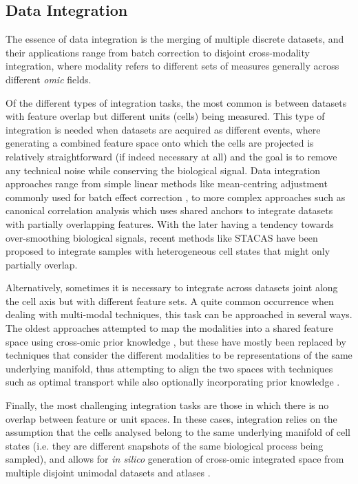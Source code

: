 \subsection{Data Integration}

The essence of data integration is the merging of multiple discrete datasets, and their applications range from batch correction to disjoint cross-modality integration, where modality refers to different sets of measures generally across different \emph{omic} fields.

Of the different types of integration tasks, the most common is between datasets with feature overlap but different units (cells) being measured. This type of integration is needed when datasets are acquired as different events, where generating a combined feature space onto which the cells are projected is relatively straightforward (if indeed necessary at all) and the goal is to remove any technical noise while conserving the biological signal. Data integration approaches range from simple linear methods like mean-centring adjustment commonly used for batch effect correction \cite{hornung_combining_2016}, to more complex approaches such as canonical correlation analysis \cite{butler_integrating_2018} which uses shared anchors to integrate datasets with partially overlapping features. With the later having a tendency towards over-smoothing biological signals, recent methods like STACAS \cite{andreatta_stacas_2021} have been proposed to integrate samples with heterogeneous cell states that might only partially overlap.

Alternatively, sometimes it is necessary to integrate across datasets joint along the cell axis but with different feature sets. A quite common occurrence when dealing with multi-modal techniques, this task can be approached in several ways. The oldest approaches attempted to map the modalities into a shared feature space using cross-omic prior knowledge \cite{chen_assessment_2019}, but these have mostly been replaced by techniques that consider the different modalities to be representations of the same underlying manifold, thus attempting to align the two spaces with techniques such as optimal transport while also optionally incorporating prior knowledge \cite{cao_unsupervised_2020, cao_multi-omics_2022}.

Finally, the most challenging integration tasks are those in which there is no overlap between feature or unit spaces. In these cases, integration relies on the assumption that the cells analysed belong to the same underlying manifold of cell states (i.e. they are different snapshots of the same biological process being sampled), and allows for \emph{in silico} generation of cross-omic integrated space from multiple disjoint unimodal datasets and atlases \cite{amodio_magan:_2018,lotfollahi_mapping_2022,cao_multi-omics_2022}.


